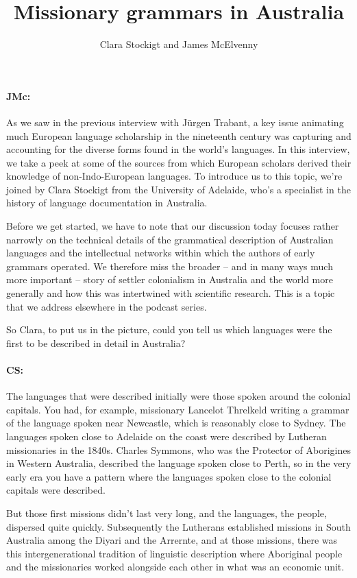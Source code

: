 \documentclass[output=paper]{langscibook}
\author{Clara Stockigt\orcid{}\affiliation{University of Adelaide} and James McElvenny\affiliation{University of Siegen}}
\title{Missionary grammars in Australia}
\begin{document}
\maketitle 


\paragraph*{JMc:}  As we saw in the previous interview with Jürgen Trabant, a key issue animating much European language scholarship in the nineteenth century was capturing and accounting for the diverse forms found in the world’s languages. In this interview, we take a peek at some of the sources from which European scholars derived their knowledge of non-Indo-European languages. To introduce us to this topic, we’re joined by Clara Stockigt from the University of Adelaide, who’s a specialist in the history of language documentation in Australia.

Before we get started, we have to note that our discussion today focuses rather narrowly on the technical details of the grammatical description of Australian languages and the intellectual networks within which the authors of early grammars operated. We therefore miss the broader – and in many ways much more important – story of settler colonialism in Australia and the world more generally and how this was intertwined with scientific research. This is a topic that we address elsewhere in the podcast series. 

So Clara, to put us in the picture, could you tell us which languages were the first to be described in detail in Australia?


\paragraph*{CS:}  The languages that were described initially were those spoken around the colonial capitals. You had, for example, missionary Lancelot Threlkeld writing a grammar of the language spoken near Newcastle, which is reasonably close to Sydney. The languages spoken close to Adelaide on the coast were described by Lutheran missionaries in the 1840s. Charles Symmons, who was the Protector of Aborigines in Western Australia, described the language spoken close to Perth, so in the very early era you have a pattern where the languages spoken close to the colonial capitals were described.

But those first missions didn’t last very long, and the languages, the people, dispersed quite quickly. Subsequently the Lutherans established missions in South Australia among the Diyari and the Arrernte, and at those missions, there was this intergenerational tradition of linguistic description where Aboriginal people and the missionaries worked alongside each other in what was an economic unit.
\end{document}
